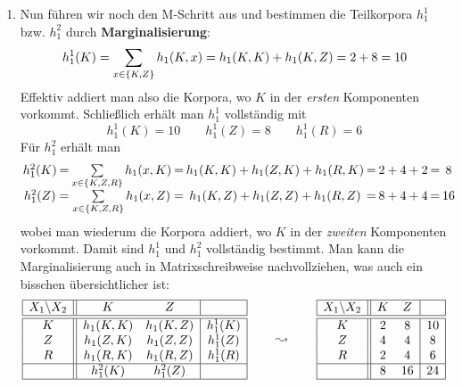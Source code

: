 \documentclass[ngerman, a4paper, 12pt]{article}
\newcommand{\begriff}[1]{\textbf{#1}}
\begin{document}
\begin{enumerate}[label=\textbf{(\alph*)}, leftmargin=0pt]
	\item
	Nun führen wir noch den M-Schritt aus und bestimmen die Teilkorpora $h_1^1$ bzw. $h_1^2$ durch \begriff{Marginalisierung}:
	\begin{equation*}
		h_1^1(K) 
		= \sum_{x \in \left\{ K,Z \right\}} h_1(K,x) 
		= h_1(K,K) + h_1(K,Z)
		= 2 + 8
		= 10
	\end{equation*}
	Effektiv addiert man also die Korpora, wo $K$ in der \textit{ersten} Komponenten vorkommt. Schließlich erhält man $h_1^1$ vollständig mit
	\begin{equation*}
		h_1^1(K) = 10 \qquad h_1^1(Z) = 8 \qquad h_1^1(R) = 6
	\end{equation*}
	Für $h_1^2$ erhält man
	\begin{equation*}
	\setlength{\arraycolsep}{1pt}
	\begin{array}{ccccccccc}
		h_1^2(K) 
		&=& \sum\limits_{x \in \menge{K,Z,R}} h_1(x,K) 
		&=& h_1(K,K) + h_1(Z,K) + h_1(R,K)
		&=& 2 + 4 + 2
		&=& 8 \\
		h_1^2(Z)
		&=& \sum\limits_{x \in \menge{K,Z,R}} h_1(x,Z)
		&=& h_1(K,Z) + h_1(Z,Z) + h_1(R,Z)
		&=& 8 + 4 + 4
		&=& 16
	\end{array}
	\end{equation*}
	wobei man wiederum die Korpora addiert, wo $K$ in der \textit{zweiten} Komponenten vorkommt.
	Damit sind $h_1^1$ und $h_1^2$ vollständig bestimmt. 
	Man kann die Marginalisierung auch in Matrixschreibweise nachvollziehen, was auch ein bisschen übersichtlicher ist:
	\begin{equation*}
		\begin{array}{|c||cc|c|}
		\hline
		X_1 \backslash X_2 & K & Z & \\ \hline \hline
		K & h_1(K,K) & h_1(K,Z) & h_1^1(K) \\
		Z & h_1(Z,K) & h_1(Z,Z) & h_1^1(Z) \\
		R & h_1(R,K) & h_1(R,Z) & h_1^1(R) \\ \hline
		  & h_1^2(K) & h_1^2(Z) & \\ \hline
		\end{array}
		\qquad \leadsto \qquad 
		\begin{array}{|c||cc|c|}
		\hline
		X_1 \backslash X_2 & K & Z & \\ \hline \hline
		K & 2 &  8 & 10 \\
		Z & 4 &  4 &  8 \\
		R & 2 &  4 &  6 \\ \hline
	      & 8 & 16 & 24 \\ \hline
		\end{array}
	\end{equation*}


\end{enumerate}
\end{document}
